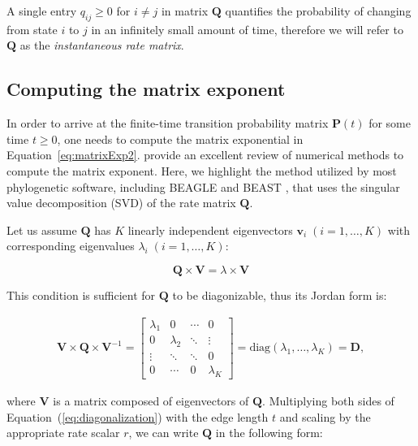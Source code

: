 \noindent
A single entry $q_{ij} \ge 0$ for $i \neq j$ in matrix $\mathbf{Q}$ quantifies the probability of changing from state $i$ to $j$ in an infinitely small amount of time, therefore we will refer to $\mathbf{Q}$ as the \emph{instantaneous rate matrix}.

\subsection{Computing the matrix exponent \label{sub:exponentiation}}

In order to arrive at the finite-time transition probability matrix $\mathbf{P}(t)$ for some time $t\geq0$, one needs to compute the matrix exponential in Equation~\ref{eq:matrixExp2}.
\cite{Moler1978} provide an excellent review of numerical methods to compute the matrix exponent. 
Here, we highlight the method utilized by most phylogenetic software, including BEAGLE \citep{Ayres2012} and BEAST \citep{Drummond2012}, that uses the singular value decomposition (SVD) of the rate matrix $\mathbf{Q}$.   

Let us assume $\mathbf{Q}$ has $K$ linearly independent eigenvectors $\mathbf{v}_{i} \; (i=1,\ldots,K)$ with corresponding eigenvalues $\lambda_{i}\;(i=1,\ldots,K)$:

\begin{equation}
\mathbf{Q}\times\mathbf{V}=\lambda\times\mathbf{V}
\label{eq:eigenvaluesEigenvectors}
\end{equation}

\noindent
This condition is sufficient for $\mathbf{Q}$ to be diagonizable, thus its Jordan form is:

\begin{align}
\mathbf{V}\times\mathbf{Q}\times\mathbf{V}^{-1}=\left[\begin{array}{cccc}
\lambda_{1} & 0 & \cdots & 0\\
0 & \lambda_{2} & \ddots & \vdots\\
\vdots & \ddots & \ddots & 0\\
0 & \cdots & 0 & \lambda_{K}
\end{array}\right] %
= \text{diag}(\lambda_{1},\ldots,\lambda_{K})=\mathbf{D} ,
\label{eq:diagonalization}
\end{align}

\noindent where $\mathbf{V}$ is a matrix composed of eigenvectors of $\mathbf{Q}$. 
Multiplying both sides of Equation~(\ref{eq:diagonalization}) with the edge length $t$ and scaling by the appropriate rate scalar $r$, we can write $\mathbf{Q}$ in the following form:

